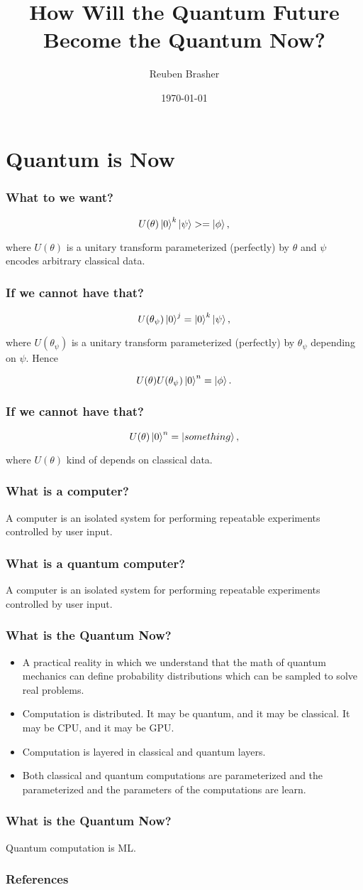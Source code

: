 \documentclass{beamer}
\title{How Will the Quantum Future Become the Quantum Now?}
\author{Reuben Brasher}
\date{\today}
\begin{document}
\frame{\titlepage}

\section[Outline]{}
\frame{\tableofcontents}

\section{Quantum is Now}

\frame
{
   \frametitle{What to we want?}

   $$U(\theta) \ket{0}^k \ket{\psi} > = \ket{\phi},$$

   where $U(\theta)$ is a unitary transform parameterized (perfectly) by $\theta$ and $\psi$ encodes arbitrary classical
   data.
}

\frame
{
   \frametitle{If we cannot have that?}

   $$U(\theta_\psi) \ket{0}^j = \ket{0}^k \ket{\psi},$$

   where $U(\theta_\psi)$ is a unitary transform parameterized (perfectly) by $\theta_\psi$ depending on $\psi$. Hence

   $$U(\theta) U(\theta_\psi) \ket{0}^n = \ket{\phi}.$$
}

\frame
{
   \frametitle{If we cannot have that?}

   $$U(\theta) \ket{0}^n = \ket{something},$$

   where $U(\theta)$ kind of depends on classical data.
}

\frame
{
   \frametitle{What is a computer?}

   A computer is an isolated system for performing repeatable experiments controlled by user input.
}

\frame
{
   \frametitle{What is a quantum computer?}

   A computer is an isolated system for performing repeatable experiments controlled by user input.
}

\frame
{
   \frametitle{What is the Quantum Now?}

   \begin{itemize}
      \item<1-> A practical reality in which we understand that the math of quantum mechanics can define probability distributions
   which can be sampled to solve real problems.

      \item<2-> Computation is distributed. It may be quantum, and it may be classical. It may be CPU, and it may be
   GPU.

      \item<3-> Computation is layered in classical and quantum layers.

      \item<4-> Both classical and quantum computations are parameterized and the parameterized and the parameters of
   the computations are learn.

   \end{itemize}

}

\frame
{
   \frametitle{What is the Quantum Now?}

   Quantum computation is ML.
}

\begin{frame}[t,allowframebreaks]
\frametitle{References}
\printbibliography
\end{frame}
\end{document}
